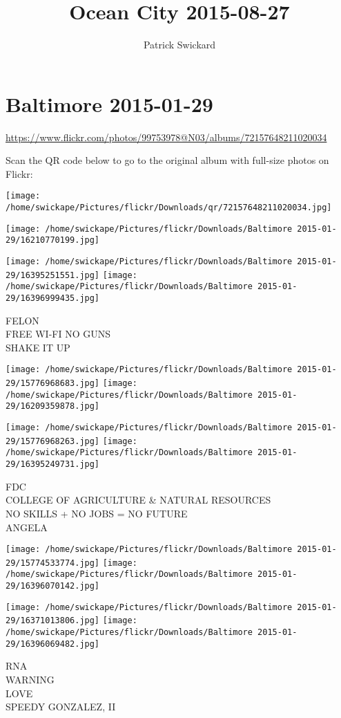 \documentclass[10pt,letterpaper]{article}
\title{Ocean City 2015-08-27}
\author{Patrick Swickard}
\date{}
\begin{document}
\section*{Baltimore 2015-01-29}

\url{https://www.flickr.com/photos/99753978@N03/albums/72157648211020034}

Scan the QR code below to go to the original album with full-size photos on Flickr:

\texttt{[image: /home/swickape/Pictures/flickr/Downloads/qr/72157648211020034.jpg]}
\pagebreak

\texttt{[image: /home/swickape/Pictures/flickr/Downloads/Baltimore 2015-01-29/16210770199.jpg]}

\vspace{0.25in}
\texttt{[image: /home/swickape/Pictures/flickr/Downloads/Baltimore 2015-01-29/16395251551.jpg]}
\texttt{[image: /home/swickape/Pictures/flickr/Downloads/Baltimore 2015-01-29/16396999435.jpg]}

FELON\\
FREE WI{-}FI NO GUNS\\
SHAKE IT UP
\pagebreak

\texttt{[image: /home/swickape/Pictures/flickr/Downloads/Baltimore 2015-01-29/15776968683.jpg]}
\texttt{[image: /home/swickape/Pictures/flickr/Downloads/Baltimore 2015-01-29/16209359878.jpg]}

\texttt{[image: /home/swickape/Pictures/flickr/Downloads/Baltimore 2015-01-29/15776968263.jpg]}
\texttt{[image: /home/swickape/Pictures/flickr/Downloads/Baltimore 2015-01-29/16395249731.jpg]}

FDC\\
COLLEGE OF AGRICULTURE \& NATURAL RESOURCES\\
NO SKILLS + NO JOBS = NO FUTURE\\
ANGELA
\pagebreak

\texttt{[image: /home/swickape/Pictures/flickr/Downloads/Baltimore 2015-01-29/15774533774.jpg]}
\texttt{[image: /home/swickape/Pictures/flickr/Downloads/Baltimore 2015-01-29/16396070142.jpg]}

\texttt{[image: /home/swickape/Pictures/flickr/Downloads/Baltimore 2015-01-29/16371013806.jpg]}
\texttt{[image: /home/swickape/Pictures/flickr/Downloads/Baltimore 2015-01-29/16396069482.jpg]}

RNA\\
WARNING\\
LOVE\\
SPEEDY GONZALEZ, II
\pagebreak
\end{document}
